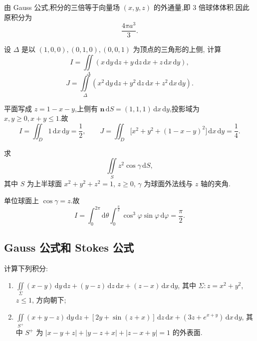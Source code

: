 \begin{solution}
    由 Gauss 公式,积分的三倍等于向量场 $(x,y,z)$ 的外通量,即 $3$ 倍球体体积.因此原积分为
    \[
        \dfrac{4\pi a^3}{3}.
    \]
\end{solution}

\begin{example}
    设 $\Delta$ 是以 $(1,0,0),(0,1,0),(0,0,1)$ 为顶点的三角形的上侧, 计算
    \[
        I=\iint\limits_\Delta(x\,\mathrm{d}y\,\mathrm{d}z+y\,\mathrm{d}z\,\mathrm{d}x+z\,\mathrm{d}x\,\mathrm{d}y),
    \]
    \[
        J=\iint\limits_\Delta(x^2\,\mathrm{d}y\,\mathrm{d}z+y^2\,\mathrm{d}z\,\mathrm{d}x+z^2\,\mathrm{d}x\,\mathrm{d}y).
    \]
\end{example}
\exampleblank

\begin{solution}
    平面写成 $z=1-x-y$,上侧有
    $\bm n\,\mathrm{d}S=(1,1,1)\,\mathrm{d}x\,\mathrm{d}y$,投影域为 $x,y\geq0,x+y\leq1$.故
    \[
        I=\iint_D1\,\mathrm{d}x\,\mathrm{d}y=\dfrac{1}{2},
        \qquad
        J=\iint_D\bigl[x^2+y^2+(1-x-y)^2\bigr]\,\mathrm{d}x\,\mathrm{d}y=\dfrac{1}{4}.
    \]
\end{solution}

\begin{example}
    求
    \[
        \iint\limits_Sz^2\cos\gamma\,\mathrm{d}S,
    \]
    其中 $S$ 为上半球面 $x^2+y^2+z^2=1$, $z\geq0$, $\gamma$ 为球面外法线与 $z$ 轴的夹角.
\end{example}
\exampleblank

\begin{solution}
    单位球面上 $\cos\gamma=z$.故
    \[
        I=\int_0^{2\pi}\!\mathrm{d}\theta\int_0^{\frac{\pi}{2}}\cos^3\varphi\sin\varphi\,\mathrm{d}\varphi=\dfrac{\pi}{2}.
    \]
\end{solution}



\subsection{Gauss 公式和 Stokes 公式}

\begin{example}
    计算下列积分:
    \begin{enumerate}
        \item $\displaystyle\iint\limits_\Sigma(x-y)\,\mathrm{d}y\,\mathrm{d}z+(y-z)\,\mathrm{d}z\,\mathrm{d}x+(z-x)\,\mathrm{d}x\,\mathrm{d}y$, 其中 $\Sigma:z=x^2+y^2$, $z\leq1$, 方向朝下;
        \item $\displaystyle\iint\limits_{S^+}(x+y-z)\,\mathrm{d}y\,\mathrm{d}z+[2y+\sin(z+x)]\,\mathrm{d}z\,\mathrm{d}x+(3z+e^{x+y})\,\mathrm{d}x\,\mathrm{d}y$, 其中 $S^+$ 为 $|x-y+z|+|y-z+x|+|z-x+y|=1$ 的外表面.
    \end{enumerate}
\end{example}
\exampleblank


